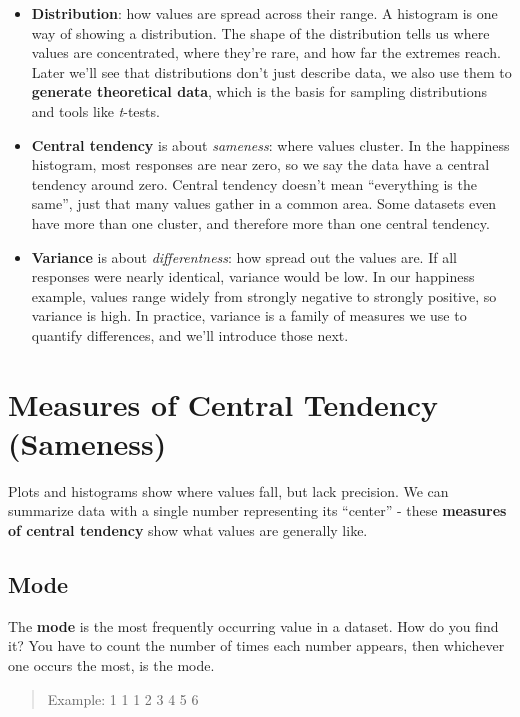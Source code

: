 \documentclass[
  letterpaper,
  DIV=11,
  numbers=noendperiod]{scrreprt}
\begin{document}
\begin{itemize}
\item
  \textbf{Distribution}: how values are spread across their range. A
  histogram is one way of showing a distribution. The shape of the
  distribution tells us where values are concentrated, where they're
  rare, and how far the extremes reach. Later we'll see that
  distributions don't just describe data, we also use them to
  \textbf{generate theoretical data}, which is the basis for sampling
  distributions and tools like \emph{t}-tests.
\item
  \textbf{Central tendency} is about \emph{sameness}: where values
  cluster. In the happiness histogram, most responses are near zero, so
  we say the data have a central tendency around zero. Central tendency
  doesn't mean ``everything is the same'', just that many values gather
  in a common area. Some datasets even have more than one cluster, and
  therefore more than one central tendency.
\item
  \textbf{Variance} is about \emph{differentness}: how spread out the
  values are. If all responses were nearly identical, variance would be
  low. In our happiness example, values range widely from strongly
  negative to strongly positive, so variance is high. In practice,
  variance is a family of measures we use to quantify differences, and
  we'll introduce those next.
\end{itemize}

\section{Measures of Central Tendency
(Sameness)}\label{measures-of-central-tendency-sameness}

Plots and histograms show where values fall, but lack precision. We can
summarize data with a single number representing its ``center'' - these
\textbf{measures of central tendency} show what values are generally
like.

\subsection{Mode}\label{mode}

The \textbf{mode} is the most frequently occurring value in a dataset.
How do you find it? You have to count the number of times each number
appears, then whichever one occurs the most, is the mode.

\begin{quote}
Example: 1 1 1 2 3 4 5 6
\end{quote}
\end{document}
